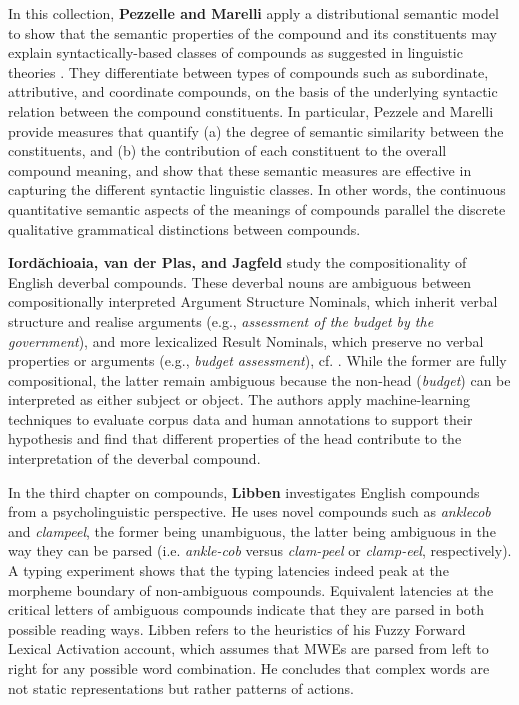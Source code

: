 \documentclass[output=paper]{langsci/langscibook}
\begin{document}
In this collection, \textbf{Pezzelle and Marelli} apply a
distributional semantic model to show that the semantic properties of
the compound and its constituents may explain syntactically-based
classes of compounds as suggested in linguistic theories
\citep{Bisetto/Scalise:05}. They differentiate between types of
compounds such as subordinate, attributive, and coordinate compounds,
on the basis of the underlying syntactic relation between the compound
constituents. In particular, Pezzele and Marelli provide measures that
quantify (a) the degree of semantic similarity between the
constituents, and (b) the contribution of each constituent to the
overall compound meaning, and show that these semantic measures are
effective in capturing the different syntactic linguistic classes. In
other words, the continuous quantitative semantic aspects of the
meanings of compounds parallel the discrete qualitative grammatical
distinctions between compounds.

\textbf{Iord\u{a}chioaia, van der Plas, and Jagfeld} study the
compositionality of English deverbal compounds. These deverbal nouns
are ambiguous between compositionally interpreted Argument Structure
Nominals, which inherit verbal structure and realise arguments
(e.g., \textit{assessment of the budget by the government}), and more
lexicalized Result Nominals, which preserve no verbal properties
or arguments (e.g., \textit{budget assessment}),
cf. \cite{Grimshaw:90}. While the former are fully compositional, the
latter remain ambiguous because the non-head (\textit{budget}) can be
interpreted as either subject or object. The authors apply
machine-learning techniques to evaluate corpus data and human
annotations to support their hypothesis and find that different
properties of the head contribute to the interpretation of the
deverbal compound.

In the third chapter on compounds, \textbf{Libben} investigates English compounds from a psycholinguistic perspective. He uses novel compounds such as \textit{anklecob} and \textit{clampeel}, the former being unambiguous, the latter being ambiguous in the way they can be parsed (i.e. \textit{ankle-cob} versus \textit{clam-peel} or \textit{clamp-eel}, respectively). A typing experiment shows that the typing latencies indeed peak at the morpheme boundary of non-ambiguous compounds. Equivalent latencies at the critical letters of ambiguous compounds indicate that they are parsed in both possible reading ways. Libben refers to the heuristics of his Fuzzy Forward Lexical Activation account, which assumes that MWEs are parsed from left to right for any possible word combination. He concludes that complex words are not static representations but rather patterns of actions.
\end{document}
